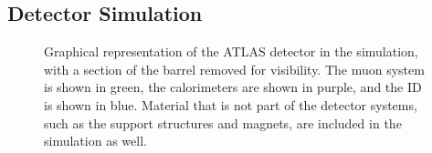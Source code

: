 
\subsection{Detector Simulation} \label{sec:geant}

\begin{figure}[h!]
\captionsetup[subfigure]{position=b}
\centering
{}
\caption{Graphical representation of the  ATLAS detector in the \geant simulation, with a section of the barrel removed for visibility. The muon system is shown in green, the calorimeters are shown in purple, and the ID is shown in blue. Material that is not part of the detector systems, such as the support structures and magnets, are included in the simulation as well.}
\label{fig:atlasGeantSim}
\end{figure}


